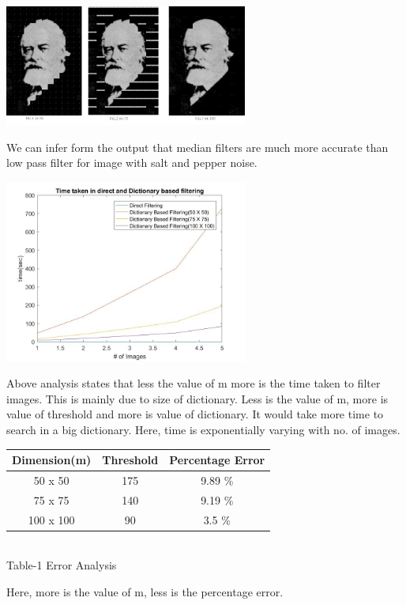 \documentclass[journal]{IEEEtran}
\begin{document}
\begin{minipage}{\linewidth}
	\centering
	\includegraphics[width=80mm]{output2.jpg}
\end{minipage} 

We can infer form the output that median filters are much more accurate than low pass filter for image with salt and pepper noise.


\begin{minipage}{\linewidth}
	\centering
	\includegraphics[width=80mm]{Timeanalysis.jpg}
\end{minipage} 

Above analysis states that less the value of m more is the time taken to filter images. This is mainly due to size of dictionary. Less is the value of m, more is value of threshold and more is value of dictionary. It would take more time to search in a big dictionary. Here, time is exponentially varying with no. of images.
\vspace{0.5cm}
\begin{center}
	\begin{tabular}{||c c c ||} 
	\hline
	Dimension(m) & Threshold  & Percentage Error \\ 
	\hline\hline
	50 x 50 & 175 & 9.89 \%  \\ 
	\hline
	75 x 75 & 140 & 9.19 \% \\ 
	\hline
	100 x 100 & 90  & 3.5 \% \\ 
	
\end{tabular}\\
 \small Table-1 Error Analysis 
\end{center}
Here, more is the value of m, less is the percentage error.
\end{document}
